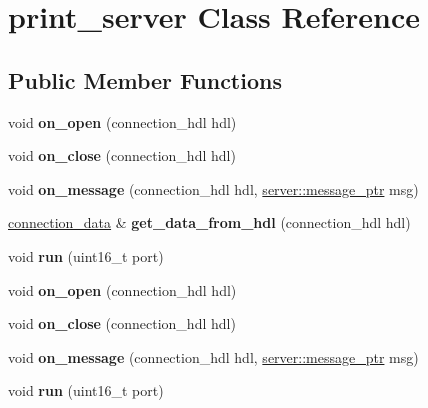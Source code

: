\hypertarget{classprint__server}{}\section{print\+\_\+server Class Reference}
\label{classprint__server}
\subsection*{Public Member Functions}
\begin{DoxyCompactItemize}
\item 
\mbox{\label{classprint__server_adc26c2f38649bdbbe97531dde369ad74}} 
void {\bfseries on\+\_\+open} (connection\+\_\+hdl hdl)
\item 
\mbox{\label{classprint__server_abb31736075d42768a36f1d953866b1c6}} 
void {\bfseries on\+\_\+close} (connection\+\_\+hdl hdl)
\item 
\mbox{\label{classprint__server_a08d4b374fa69846cb78ecf54b40cfd70}} 
void {\bfseries on\+\_\+message} (connection\+\_\+hdl hdl, \mbox{\hyperlink{classwebsocketpp_1_1endpoint_a585ecbbfd9689d4e4229e4c8378bd672}{server\+::message\+\_\+ptr}} msg)
\item 
\mbox{\label{classprint__server_a887cff1be2a37977309ee16cfcb01c5c}} 
\mbox{\hyperlink{structconnection__data}{connection\+\_\+data}} \& {\bfseries get\+\_\+data\+\_\+from\+\_\+hdl} (connection\+\_\+hdl hdl)
\item 
\mbox{\label{classprint__server_a724db97a6c441b5db090f6274c6112d8}} 
void {\bfseries run} (uint16\+\_\+t port)
\item 
\mbox{\label{classprint__server_adc26c2f38649bdbbe97531dde369ad74}} 
void {\bfseries on\+\_\+open} (connection\+\_\+hdl hdl)
\item 
\mbox{\label{classprint__server_abb31736075d42768a36f1d953866b1c6}} 
void {\bfseries on\+\_\+close} (connection\+\_\+hdl hdl)
\item 
\mbox{\label{classprint__server_a08d4b374fa69846cb78ecf54b40cfd70}} 
void {\bfseries on\+\_\+message} (connection\+\_\+hdl hdl, \mbox{\hyperlink{classwebsocketpp_1_1endpoint_a585ecbbfd9689d4e4229e4c8378bd672}{server\+::message\+\_\+ptr}} msg)
\item 
\mbox{\label{classprint__server_a724db97a6c441b5db090f6274c6112d8}} 
void {\bfseries run} (uint16\+\_\+t port)
\end{DoxyCompactItemize}


